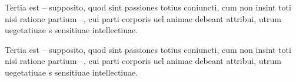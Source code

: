 \documentclass{article}
\begin{document}
\makeatletter


















\begin{pairs}
\begin{Rightside}
\beginnumbering

\pstart
Tertia est – supposito, quod sint passiones totius coniuncti, cum non insint toti nisi ratione partium –, cui parti corporis uel animae debeant attribui,  utrum uegetatiuae  s  sensitiuae 
intellectiuae.


\pend

\endnumbering

\end{Rightside}
  \begin{Leftside}
\beginnumbering

\pstart
Tertia est – supposito, quod sint passiones totius coniuncti, cum non insint toti nisi ratione partium –, cui parti corporis uel animae debeant attribui,  utrum uegetatiuae  s  sensitiuae 
intellectiuae.


\pend

\endnumbering
 

  \end{Leftside}
\end{pairs}
\Columns


\makeatother
\end{document}

